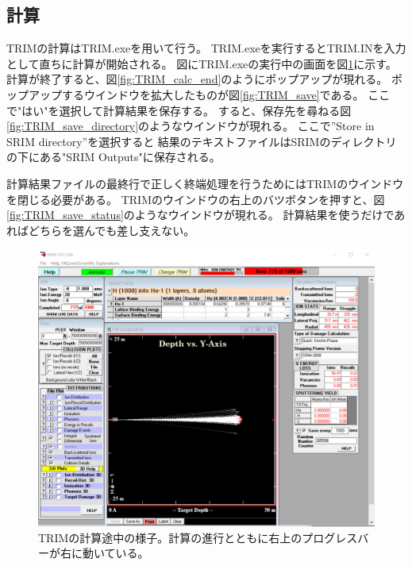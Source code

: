 \documentclass [11pt,a4paper,dvipdfmx] {jarticle}
\begin{document}
\subsection{計算}
TRIMの計算はTRIM.exeを用いて行う。
TRIM.exeを実行するとTRIM.INを入力として直ちに計算が開始される。
図にTRIM.exeの実行中の画面を図\ref{fig:TRIM_calc}に示す。
計算が終了すると、図\ref{fig:TRIM_calc_end}のようにポップアップが現れる。
ポップアップするウインドウを拡大したものが図\ref{fig:TRIM_save}である。
ここで"はい"を選択して計算結果を保存する。
すると、保存先を尋ねる図\ref{fig:TRIM_save_directory}のようなウインドウが現れる。
ここで”Store in SRIM directory”を選択すると
結果のテキストファイルはSRIMのディレクトリの下にある"SRIM Outputs"に保存される。

計算結果ファイルの最終行で正しく終端処理を行うためにはTRIMのウインドウを閉じる必要がある。
TRIMのウインドウの右上のバツボタンを押すと、図\ref{fig:TRIM_save_status}のようなウインドウが現れる。
計算結果を使うだけであればどちらを選んでも差し支えない。

\begin{figure}[H]
    \centering
    \includegraphics[width=12cm]{./pic/TRIM_calc.jpg}
    \caption{TRIMの計算途中の様子。計算の進行とともに右上のプログレスバーが右に動いている。}
    \label{fig:TRIM_calc}
\end{figure}
\end{document}
